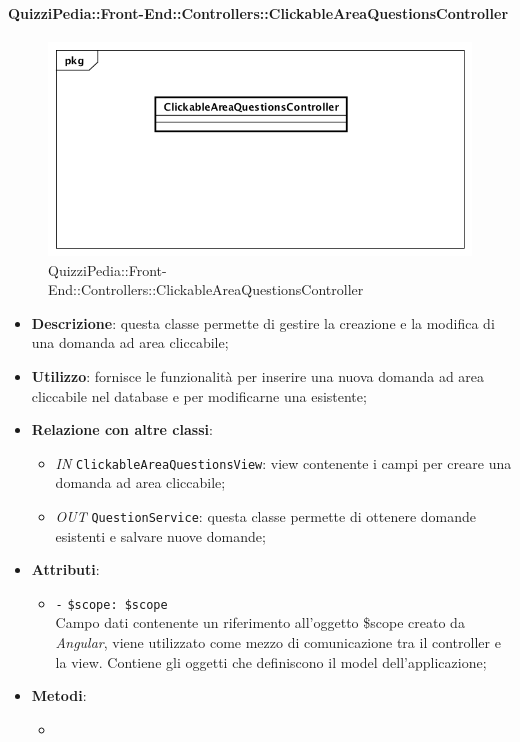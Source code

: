 \paragraph{QuizziPedia::Front-End::Controllers::ClickableAreaQuestionsController}
\begin{figure}
	\centering
	\includegraphics[scale=0.45]{UML/Classi/Front-End/QuizziPedia_Front-end_Controller_ClickableAreaQuestionsController.png}
	\caption{QuizziPedia::Front-End::Controllers::ClickableAreaQuestionsController}
\end{figure}
\begin{itemize}
	\item \textbf{Descrizione}: questa classe permette di gestire la creazione e la modifica di una domanda ad area cliccabile;
	\item \textbf{Utilizzo}: fornisce le funzionalità per inserire una nuova domanda ad area cliccabile nel database e per modificarne una esistente;
	\item \textbf{Relazione con altre classi}:
	\begin{itemize}
		\item \textit{IN} \texttt{ClickableAreaQuestionsView}: view contenente i campi per creare una domanda ad area cliccabile; 
		\item \textit{OUT} \texttt{QuestionService}: questa classe permette di ottenere domande esistenti e salvare nuove domande;
	\end{itemize}
	\item \textbf{Attributi}:
	\begin{itemize}
		\item \texttt{-} \texttt{\$scope: \$scope} \\
		Campo dati contenente un riferimento all’oggetto \$scope creato da \textit{Angular}, viene utilizzato come mezzo di comunicazione tra il controller e la view. Contiene gli oggetti che definiscono il model dell’applicazione;
	\end{itemize}
	\item \textbf{Metodi}:
	\begin{itemize}
		\item 
	\end{itemize}
\end{itemize}

